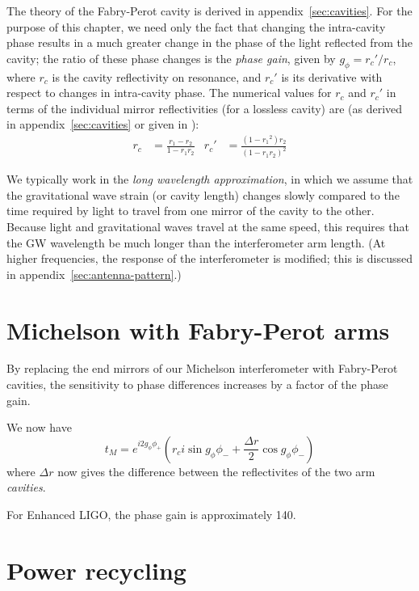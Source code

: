 The theory of the Fabry-Perot cavity is derived in 
appendix~\ref{sec:cavities}.  For the purpose of this chapter, we
need only the fact that changing the intra-cavity phase results in a
much greater change in the phase of the light reflected from the
cavity; the ratio of these phase changes is the \emph{phase gain},
given by $g_\phi = r_c'/r_c$, where $r_c$ is the cavity reflectivity on
resonance, and $r_c'$ is its derivative with respect to changes in
intra-cavity phase.  The numerical values for $r_c$ and $r_c'$ in terms of the individual mirror reflectivities (for a lossless cavity) are (as derived in appendix~\ref{sec:cavities} or given in \cite{LigoFreqResponse97}):
%
\begin{align}
r_c & = \frac{r_1 - r_2}{1 - r_1 r_2} &
r_c'& = \frac{\left(1 - {r_1}^2\right)r_2}{\left(1 - r_1 r_2\right)^2}
\end{align}

\label{sec:long-wavelength}We typically work in the \emph{long wavelength approximation}, in
which we assume that the gravitational wave strain (or cavity length)
changes slowly compared to the time required by light to travel from
one mirror of the cavity to the other.  Because light and
gravitational waves travel at the same speed, this requires that the
GW wavelength be much longer than the interferometer arm length.  (At
higher frequencies, the response of the interferometer is modified;
this is discussed in appendix~\ref{sec:antenna-pattern}.)


\section{Michelson with Fabry-Perot arms}

By replacing the end mirrors of our Michelson interferometer with
Fabry-Perot cavities, the sensitivity to phase differences increases
by a factor of the phase gain.  

We now have
\begin{equation}
t_M  = e^{i 2 g_\phi \phi_+} 
\left( r_c i \sin g_\phi \phi_- + 
        \frac{\Delta r}{2} \cos g_\phi \phi_- \right)
\end{equation}
where $\Delta r$ now gives the difference between the reflectivites of the
two arm \emph{cavities}.

For Enhanced LIGO, the phase gain is approximately 140.

\section{Power recycling}

